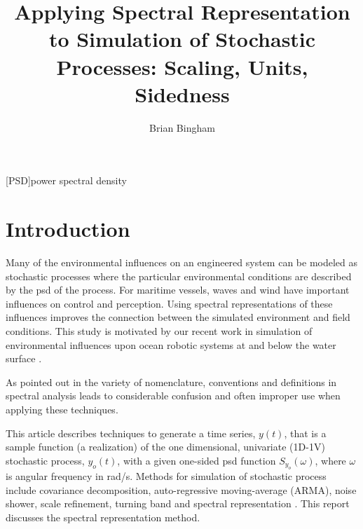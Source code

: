 \documentclass[techreport, article]{npsreport2018}
\title{Applying Spectral Representation to Simulation of Stochastic Processes: Scaling, Units, Sidedness}
\author{Brian Bingham}
\begin{document}
\NPScover                  %
\NPSsftne                  %
\NPSsignature             %
\NPSabstractpage           %
\newcommand{\SF}{0.8}
\newcommand{\SFb}{0.45}
\newcommand{\SFPic}{0.45}
\newcommand{\SFPlot}{0.45}
\newcommand{\SFc}{0.52}
\newcommand{\FigWidth}{\SF}


%
%

[PSD]{power spectral density}


\NPSbody

\section{Introduction}
Many of the environmental influences on an engineered system can be modeled as stochastic processes where the particular environmental conditions are described by the \ac{psd} of the process.  For maritime vessels, waves and wind have important influences on control and perception.  Using spectral representations of these influences improves the connection between the simulated environment and field conditions.  This study is motivated by our recent work in simulation of environmental influences upon ocean robotic systems at and below the water surface \cite{bingham2019maritime, zhang22dave, choi22fasterrohtua}.

As pointed out in \cite{barbour15normalization} the variety of nomenclature, conventions and definitions in spectral analysis leads to considerable confusion and often improper use when applying these techniques.

This article describes techniques to generate a time series, $y(t)$, that is a sample function (a realization) of the one dimensional, univariate (1D-1V) stochastic process, $y_o(t)$, with a given one-sided \ac{psd} function $S_{y_{o}}(\omega)$, where $\omega$ is angular frequency in \unit[]{rad/s}.  %
Methods for simulation of stochastic process include covariance decomposition, auto-regressive moving-average (ARMA), noise shower, scale refinement, turning band and spectral representation \cite{cao00simulation}.  This report discusses the spectral representation method.
\end{document}
